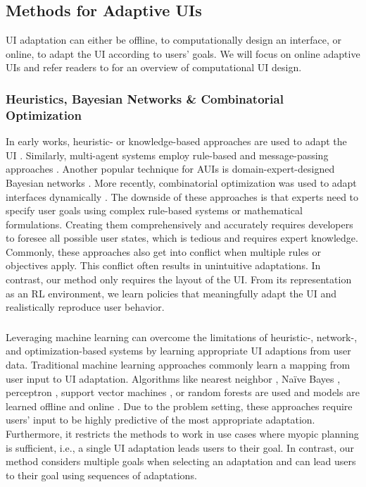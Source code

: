 \subsection{Methods for Adaptive UIs}
UI adaptation can either be offline, to computationally design an interface, or online, to adapt the UI according to users' goals. We will focus on online adaptive UIs and refer readers to \cite{combinatorialoptimizationdesign2020oulasvirta, functionalityselection2017oulasvirta} for an overview of computational UI design.

\subsubsection{Heuristics, Bayesian Networks \& Combinatorial Optimization}
In early works, heuristic- or knowledge-based approaches are used to adapt the UI  \cite{Browne1990,Stephanidis1997,Smith2010}.
Similarly, multi-agent systems employ rule-based and message-passing approaches  \citep{Rich1998,Rich2005,Yorke2012}. Another popular technique for AUIs is domain-expert-designed Bayesian networks  \citep{Horvitz1998, Bosma2004}.
More recently, combinatorial optimization was used to adapt interfaces dynamically \cite{park2018adam, lindlbauer2019context}.
The downside of these approaches is that experts need to specify user goals using complex rule-based systems or mathematical formulations. 
Creating them comprehensively and accurately requires developers to foresee all possible user states, which is tedious and requires expert knowledge.
Commonly, these approaches also get into conflict when multiple rules or objectives apply.
This conflict often results in unintuitive adaptations.
In contrast, our method only requires the layout of the UI.
From its representation as an RL environment, we learn policies that meaningfully adapt the UI and realistically reproduce user behavior.

\subsubsection{ }
Leveraging machine learning can overcome the limitations of heuristic-, network-, and optimization-based systems by learning appropriate UI adaptions from user data.
Traditional machine learning approaches commonly learn a mapping from user input to UI adaptation. 
Algorithms like nearest neighbor  \cite{Maes1995, Lashkari1997}, Na\"ive Bayes  \cite{McCreath2006,Faulring2010}, perceptron \cite{Shen2009a, Shen2009b}, support vector machines \cite{Berry2011}, or random forests \cite{Pejovic2014, Mehrotra2015} are used and models are learned offline \cite{Berry2011} and online \cite{Shen2009a}.
Due to the problem setting, these approaches require users' input to be highly predictive of the most appropriate adaptation. 
Furthermore, it restricts the methods to work in use cases where myopic planning is sufficient, i.e., a single UI adaptation leads users to their goal. 
In contrast, our method considers multiple goals when selecting an adaptation and can lead users to their goal using sequences of adaptations. 

